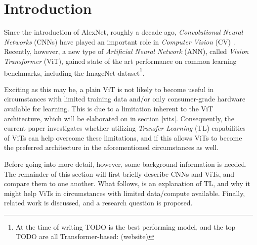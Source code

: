 \section{Introduction}
Since the introduction of AlexNet, roughly a decade ago, \textit{Convolutional Neural Networks} (CNNs) have played an important role in \textit{Computer Vision} (CV) \citep{krizhevsky2012imagened}. Recently, however, a new type of \textit{Artificial Neural Network} (ANN), called \textit{Vision Transformer} (ViT), gained state of the art performance on common learning benchmarks, including the ImageNet dataset\footnote{At the time of writing TODO is the best performing model, and the top TODO are all Transformer-based: (website)}.

Exciting as this may be, a plain ViT is not likely to become useful in circumstances with limited training data and/or only consumer-grade hardware available for learning. This is due to a limitation inherent to the ViT architecture, which will be elaborated on in section \ref{vits}. Consequently, the current paper investigates whether utilizing \textit{Transfer Learning} (TL) capabilities of ViTs can help overcome these limitations, and if this allows ViTs to become the preferred architecture in the aforementioned circumstances as well.

Before going into more detail, however, some background information is needed. The remainder of this section will first briefly describe CNNs and ViTs, and compare them to one another. What follows, is an explanation of TL, and why it might help ViTs in circumstances with limited data/compute available. Finally, related work is discussed, and a research question is proposed.


